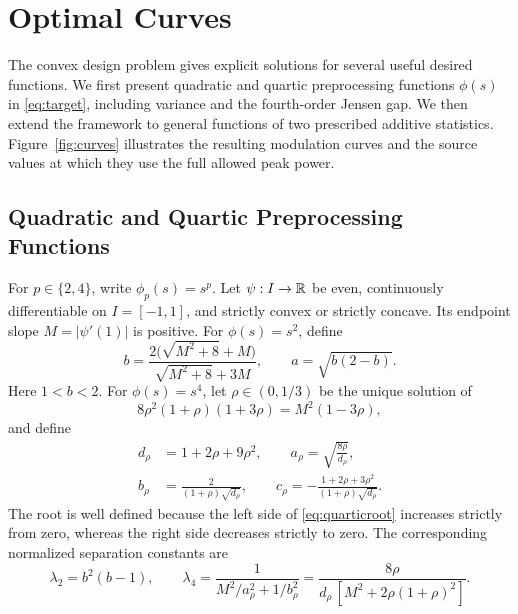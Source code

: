 \section{Optimal Curves}\label{sec:examples}

The convex design problem gives explicit solutions for several useful desired functions. We first present quadratic and quartic preprocessing functions $\phi(s)$ in \eqref{eq:target}, including variance and the fourth-order Jensen gap. We then extend the framework to general functions of two prescribed additive statistics. Figure~\ref{fig:curves} illustrates the resulting modulation curves and the source values at which they use the full allowed peak power.

\subsection{Quadratic and Quartic Preprocessing Functions}
\label{sec:quadratic-quartic}
For $p\in\{2,4\}$, write $\phi_p(s)=s^p$. Let $\psi:I\to\mathbb R$ be even, continuously differentiable on $I=[-1,1]$, and strictly convex or strictly concave. Its endpoint slope $M=|\psi'(1)|$ is positive. For $\phi(s)=s^2$, define
$$
 b=\frac{2\bigl(\sqrt{M^2+8}+M\bigr)}{\sqrt{M^2+8}+3M},
 \qquad a=\sqrt{b(2-b)}.
$$
Here $1<b<2$. For $\phi(s)=s^4$, let $\rho\in(0,1/3)$ be the unique solution of
\begin{equation}
 8\rho^2(1+\rho)(1+3\rho)=M^2(1-3\rho),
 \label{eq:quarticroot}
\end{equation}
and define
\begin{equation}
\begin{aligned}
 d_\rho&=1+2\rho+9\rho^2,\qquad
 a_\rho=\sqrt{\frac{8\rho}{d_\rho}},\\
 b_\rho&=\frac{2}{(1+\rho)\sqrt{d_\rho}},\qquad
 c_\rho=-\frac{1+2\rho+3\rho^2}{(1+\rho)\sqrt{d_\rho}}.
\end{aligned}
\label{eq:quarticcoefficients}
\end{equation}
The root is well defined because the left side of \eqref{eq:quarticroot} increases strictly from zero, whereas the right side decreases strictly to zero. The corresponding normalized separation constants are
$$
 \lambda_2=b^2(b-1),\qquad
 \lambda_4=\frac{1}{M^2/a_\rho^2+1/b_\rho^2}
 =\frac{8\rho}{d_\rho\,[M^2+2\rho(1+\rho)^2]}.
$$

